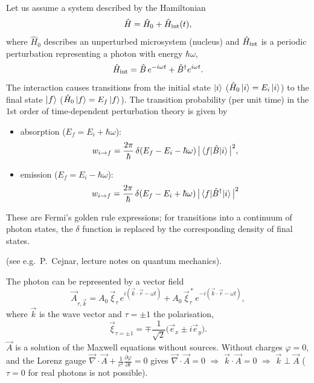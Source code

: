 \documentclass[11pt,a4paper]{article}
\newcommand{\op}[1]{\hat{#1}}
\begin{document}
Let us assume a system described by the Hamiltonian
\[
\op H=\op H_0+\op H_{\rm int}(t),
\]
where $\op H_0$ describes an unperturbed microsystem (nucleus) and $\op H_{\rm int}$ is a periodic perturbation representing a photon with energy $\hbar\omega$,
\[
\op H_{\rm int}=\op B\,e^{-i\omega t}+\op B^\dagger e^{i\omega t}.
\]
The interaction causes transitions from the initial state $\ket i$ ($\op H_0\ket i=E_i\ket i$) to the final state $\ket f$ ($\op H_0\ket f=E_f\ket f$). The transition probability (per unit time) in the 1st order of time-dependent perturbation theory is given by
\begin{itemize}
\item absorption ($E_f=E_i+\hbar\omega$):
\[
w_{i\to f}=\frac{2\pi}{\hbar}\,\delta(E_f-E_i-\hbar\omega)\,\big|\braket{f|\op B|i}\big|^2 ,
\]
\item emission ($E_f=E_i-\hbar\omega$):
\[
w_{i\to f}=\frac{2\pi}{\hbar}\,\delta(E_f-E_i+\hbar\omega)\,\big|\braket{f|\op B^\dagger|i}\big|^2
\]
\end{itemize}

These are Fermi's golden rule expressions; for transitions into a continuum of photon states, the $\delta$ function is replaced by the corresponding density of final states.

(see e.g.\ P.~Cejnar, lecture notes on quantum mechanics).

The photon can be represented by a vector field
\[
\vec A_{\tau,\vec k}=A_0\,\vec\xi_\tau\,e^{i(\vec k\cdot\vec r-\omega t)}+A_0\,\vec\xi^{\,*}_\tau\,e^{-i(\vec k\cdot\vec r-\omega t)},
\]
where $\vec k$ is the wave vector and $\tau=\pm1$ the polarisation,
\[
\vec\xi_{\tau=\pm1}=\mp\frac{1}{\sqrt2}\big(\vec e_x\pm i\vec e_y\big).
\]
$\vec A$ is a solution of the Maxwell equations without sources. Without charges $\varphi=0$, and the Lorenz gauge $\vec\nabla\cdot\vec A+\frac{1}{c^2}\frac{\partial\varphi}{\partial t}=0$ gives $\vec\nabla\cdot\vec A=0$ $\Rightarrow$ $\vec k\cdot\vec A=0$ $\Rightarrow$ $\vec k\perp\vec A$ ($\tau=0$ for real photons is not possible).
\end{document}
